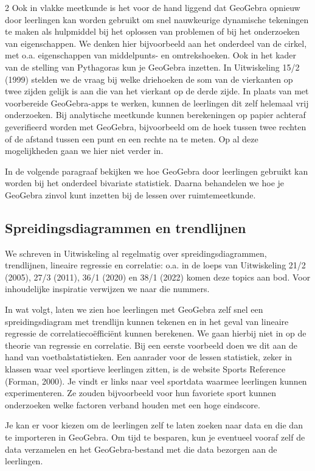 \begin{multicols}{2}
Ook in vlakke meetkunde is het voor de hand liggend dat GeoGebra opnieuw door leerlingen kan worden gebruikt om snel nauwkeurige dynamische tekeningen te maken als hulpmiddel bij het oplossen van problemen of bij het onderzoeken van eigenschappen. We denken hier bijvoorbeeld aan het onderdeel van de cirkel, met o.a. eigenschappen van middelpunts- en omtrekshoeken. Ook in het kader van de stelling van Pythagoras kun je Geo\-Gebra inzetten. In Uitwiskeling 15/2 (1999) stelden we de vraag bij welke driehoeken de som van de vierkanten op twee zijden gelijk is aan die van het vierkant op de derde zijde. 
In plaats van met voorbereide GeoGebra-apps te werken, kunnen de leerlingen dit zelf helemaal vrij onderzoeken. Bij analytische meetkunde kunnen berekeningen op papier achteraf geverifieerd worden met GeoGebra, bijvoorbeeld om de hoek tussen twee rechten of de afstand tussen een punt en een rechte na te meten. Op al deze mogelijkheden gaan we hier niet verder in.

In de volgende paragraaf bekijken we hoe Geo\-Gebra door leerlingen gebruikt kan worden bij het onderdeel bivariate statistiek. Daarna behandelen we hoe je GeoGebra zinvol kunt inzetten bij de lessen over ruimtemeetkunde.

\subsection{Spreidingsdiagrammen en trendlijnen}

We schreven in Uitwiskeling al regelmatig over spreidingsdiagrammen, trendlijnen, lineaire regressie en correlatie: o.a. in de loeps van Uitwiskeling 21/2 (2005), 27/3 (2011), 36/1 (2020) en 38/1 (2022) komen deze topics aan bod. Voor inhoudelijke inspiratie verwijzen we naar die nummers. 

In wat volgt, laten we zien hoe leerlingen met GeoGebra zelf snel een spreidingsdiagram met trendlijn kunnen tekenen en in het geval van lineaire regressie de correlatiecoëfficiënt kunnen berekenen. We gaan hierbij niet in op de theorie  van regressie en correlatie. Bij een eerste voorbeeld doen we dit aan de hand van voetbalstatistieken. Een aanrader voor de lessen statistiek, zeker in klassen waar veel sportieve leerlingen zitten, is de website Sports Reference (Forman, 2000). Je vindt er links naar veel sportdata waarmee leerlingen kunnen experimenteren. Ze zouden bijvoorbeeld voor hun favoriete sport kunnen onderzoeken welke factoren verband houden met een hoge eindscore.

Je kan er voor kiezen om de leerlingen zelf te laten zoeken naar data en die dan te importeren in GeoGebra. Om tijd te besparen, kun je eventueel vooraf zelf de data verzamelen en het GeoGebra-bestand met die data bezorgen aan de leerlingen.

\end{multicols}


